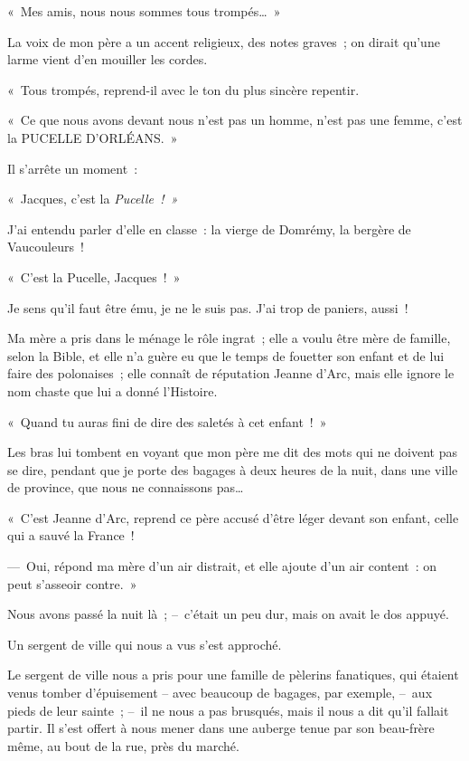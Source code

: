 \documentclass[french,twoside]{book} %
\begin{document}
\noindent « Mes amis, nous nous sommes tous trompés… »\par
La voix de mon père a un accent religieux, des notes graves ; on dirait qu’une larme vient d’en mouiller les cordes.\par
« Tous trompés, reprend-il avec le ton du plus sincère repentir.\par
« Ce que nous avons devant nous n’est pas un homme, n’est pas une femme, c’est la PUCELLE D’ORLÉANS. »\par
Il s’arrête un moment :\par
« Jacques, c’est la \emph{Pucelle ! »}\par
J’ai entendu parler d’elle en classe : la vierge de Domrémy, la bergère de Vaucouleurs !\par
« C’est la Pucelle, Jacques ! »\par
\bigbreak
\noindent Je sens qu’il faut être ému, je ne le suis pas. J’ai trop de paniers, aussi !\par
Ma mère a pris dans le ménage le rôle ingrat ; elle a voulu être mère de famille, selon la Bible, et elle n’a guère eu que le temps de fouetter son enfant et de lui faire des polonaises ; elle connaît de réputation Jeanne d’Arc, mais elle ignore le nom chaste que lui a donné l’Histoire.\par
« Quand tu auras fini de dire des saletés à cet enfant ! »\par
Les bras lui tombent en voyant que mon père me dit des mots qui ne doivent pas se dire, pendant que je porte des bagages à deux heures de la nuit, dans une ville de province, que nous ne connaissons pas…\par
« C’est Jeanne d’Arc, reprend ce père accusé d’être léger devant son enfant, celle qui a sauvé la France !\par
— Oui, répond ma mère d’un air distrait, et elle ajoute d’un air content : on peut s’asseoir contre. »\par
\bigbreak
\noindent Nous avons passé la nuit là ; – c’était un peu dur, mais on avait le dos appuyé.\par
Un sergent de ville qui nous a vus s’est approché.\par
Le sergent de ville nous a pris pour une famille de pèlerins fanatiques, qui étaient venus tomber d’épuisement – avec beaucoup de bagages, par exemple, – aux pieds de leur sainte ; – il ne nous a pas brusqués, mais il nous a dit qu’il fallait partir. Il s’est offert à nous mener dans une auberge tenue par son beau-frère même, au bout de la rue, près du marché.\par
\end{document}
